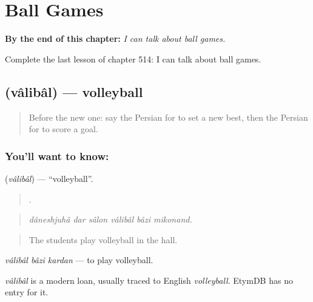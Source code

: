 
\chapter{Ball Games}
\label{ch:fa-ball-games}

\begin{chapteropening}
\textbf{By the end of this chapter:} \emph{I can talk about ball games.}

Complete the last lesson of chapter 514: I can talk about ball games.
\end{chapteropening}

\section[\texorpdfstring{\fa{والیبال} (vâlibâl)}{والیبال (vâlibâl)}]{ (vâlibâl) — volleyball}

\label{lesson:FA-C514-valibal}



\begin{quote}
Before the new one: say the Persian for to set a new best, then the Persian for to score a goal.
\end{quote}

\subsection*{You'll want to know: }
\textbf{} (\emph{vâlibâl}) — \textquotedblleft{}volleyball\textquotedblright{}.

\begin{quote}
     .
\end{quote}

\begin{quote}
\emph{dâneshjuhâ dar sâlon vâlibâl bâzi mikonand.}
\end{quote}

\begin{quote}
The students play volleyball in the hall.
\end{quote}

\emph{vâlibâl bâzi kardan} — to play volleyball.

\begin{cousinweb}
\emph{vâlibâl} is a modern loan, usually traced to English \emph{volleyball}. EtymDB has no entry for it.
\end{cousinweb}

